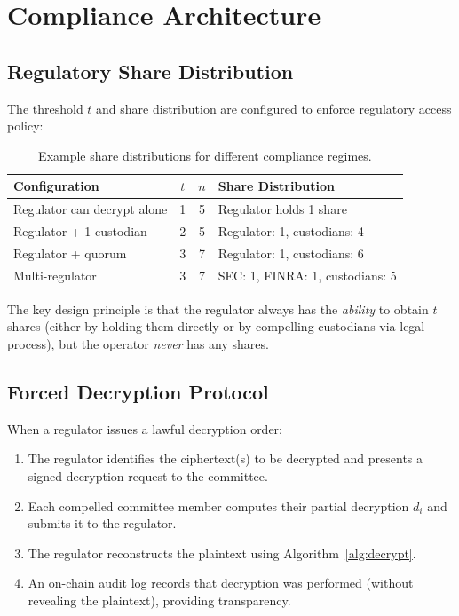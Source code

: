 \section{Compliance Architecture}

\label{sec:compliance}

\subsection{Regulatory Share Distribution}

The threshold $t$ and share distribution are configured to enforce
regulatory access policy:

\begin{table}[h]
\centering
\begin{tabular}{lccl}
\toprule
\textbf{Configuration} & $t$ & $n$ & \textbf{Share Distribution} \\
\midrule
Regulator can decrypt alone & 1 & 5 & Regulator holds 1 share \\
Regulator + 1 custodian & 2 & 5 & Regulator: 1, custodians: 4 \\
Regulator + quorum & 3 & 7 & Regulator: 1, custodians: 6 \\
Multi-regulator & 3 & 7 & SEC: 1, FINRA: 1, custodians: 5 \\
\bottomrule
\end{tabular}
\caption{Example share distributions for different compliance regimes.}
\label{tab:share-dist}
\end{table}

The key design principle is that the regulator always has the
\emph{ability} to obtain $t$ shares (either by holding them directly or
by compelling custodians via legal process), but the operator
\emph{never} has any shares.

\subsection{Forced Decryption Protocol}

When a regulator issues a lawful decryption order:

\begin{enumerate}[nosep]
  \item The regulator identifies the ciphertext(s) to be decrypted and
        presents a signed decryption request to the committee.
  \item Each compelled committee member computes their partial decryption
        $d_i$ and submits it to the regulator.
  \item The regulator reconstructs the plaintext using Algorithm~\ref{alg:decrypt}.
  \item An on-chain audit log records that decryption was performed
        (without revealing the plaintext), providing transparency.
\end{enumerate}

